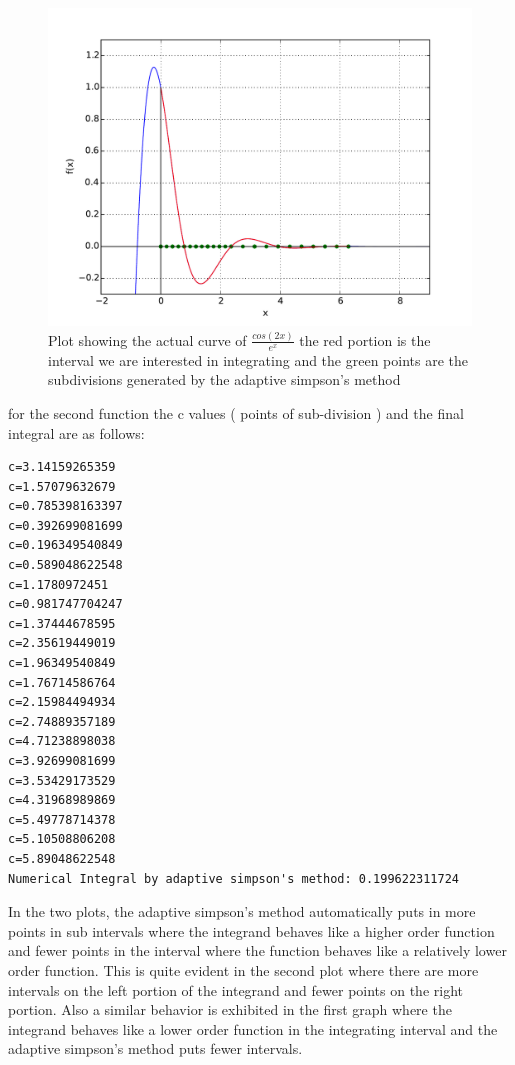 \documentclass[a4paper,11pt]{article}
\begin{document}
\begin{figure}[ht]
	\center
	\includegraphics[scale=0.45]{ex5_fig2.pdf}
    \caption{Plot showing the actual curve of $\frac{cos(2x)}{e^x}$ the red portion is the interval we are interested in integrating and the green points are the subdivisions generated by the adaptive simpson's method}
	\label{fig:err1}
\end{figure}
for the second function the c values ( points of sub-division ) and the final integral are as follows:
\begin{lstlisting}
c=3.14159265359
c=1.57079632679
c=0.785398163397
c=0.392699081699
c=0.196349540849
c=0.589048622548
c=1.1780972451
c=0.981747704247
c=1.37444678595
c=2.35619449019
c=1.96349540849
c=1.76714586764
c=2.15984494934
c=2.74889357189
c=4.71238898038
c=3.92699081699
c=3.53429173529
c=4.31968989869
c=5.49778714378
c=5.10508806208
c=5.89048622548
Numerical Integral by adaptive simpson's method: 0.199622311724
\end{lstlisting}


	
In the two plots, the adaptive simpson's method automatically puts in more points in sub intervals where the integrand behaves like a higher order function and fewer points in the interval where the function behaves like a relatively lower order function. This is quite evident in the second plot where there are more intervals on the left portion of the integrand and fewer points on the right portion. Also a similar behavior is exhibited in the first graph where the integrand behaves like a lower order function in the integrating interval and the adaptive simpson's method puts fewer intervals.
\end{document}
